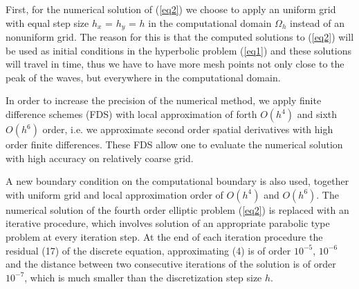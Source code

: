 \documentclass[preprint]{elsarticle}
\newcommand{\rf}[1]{(\ref{#1})}
\begin{document}
First, for the numerical solution of \rf{eq2} we choose to apply an uniform grid with equal step size $h_x$ = $h_y$ = $h$ in the computational domain $\Omega_h$ instead of an nonuniform grid. The reason for this is that  
%
 the computed solutions to \rf{eq2} will be used as initial conditions in the hyperbolic problem \rf{eq1} and these solutions will travel in time, thus we have to have more mesh points not only close to the peak of the waves, but everywhere in   the  computational domain. 

In order to increase the precision of the numerical method, we apply finite difference schemes (FDS) with local approximation of forth $O(h^4)$ and sixth $O(h^6)$ order, i.e. we  approximate second order spatial derivatives with high order finite differences. These  FDS allow one to evaluate the numerical solution with high accuracy on relatively coarse grid. 

A new boundary condition on the computational boundary is also used, together with uniform grid and local approximation order of $O(h^4)$ and $O(h^6)$. The numerical solution of the fourth order elliptic problem \rf{eq2} is replaced with an iterative procedure, which involves solution  of an appropriate  parabolic type problem at every iteration step. %
At the end of each iteration procedure the residual (17) of the discrete equation, approximating (4) is of order $10^{-5}$, $10^{-6}$ and the distance between two consecutive iterations of the solution is of order $10^{-7}$, which is much smaller than the discretization step size $h$.
 
\end{document}
